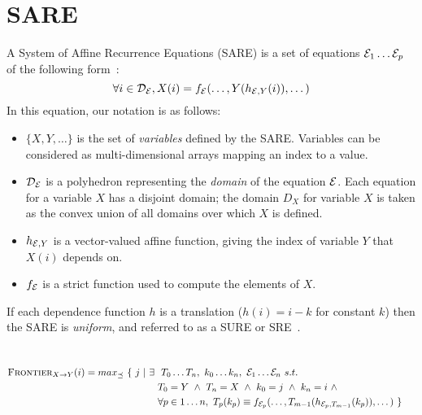 \section{SARE}

A System of Affine Recurrence Equations (SARE) is a set of equations
${\cal E}_1 \dots {\cal E}_p$ of the following form~\cite{DRV00}:
\begin{equation}
\forall i \in {\cal D_{\cal E}}, X(i) = f_{\cal E}(\dots, Y(h_{{\cal
E}, Y}(i)), \dots)
\label{eq:sare}
\end{equation}
In this equation, our notation is as follows:
\begin{itemize}

\item $\{X, Y, \dots\}$ is the set of {\it variables} defined by the
SARE.  Variables can be considered as multi-dimensional arrays mapping
an index to a value.

\item ${\cal D_{\cal E}}$ is a polyhedron representing the {\it
domain} of the equation ${\cal E}$.  Each equation for a variable $X$
has a disjoint domain; the domain $D_X$ for variable $X$ is taken as
the convex union of all domains over which $X$ is defined.

\item $h_{{\cal E}, Y}$ is a vector-valued affine function, giving the
index of variable $Y$ that $X(i)$ depends on.

\item $f_{\cal E}$ is a strict function used to compute the elements
of $X$.

\end{itemize}

If each dependence function $h$ is a translation ($h(i) = i - k$ for
constant $k$) then the SARE is {\it uniform}, and referred to as a
SURE or SRE~\cite{karp67}.


\section{\dep}

\begin{align*}
\textsc{Frontier}_{X \small{\rightarrow} Y}(i) = max_{\preceq}~\{~ j ~|~ \exists ~&~ T_0 \dots T_n, ~ k_0 \dots k_n, ~ {\cal E}_1 \dots {\cal E}_n ~ s.t. ~ & ~ \\ 
~ & T_0 = Y ~\wedge~ T_n = X ~\wedge~ k_0 = j ~\wedge~ k_n = i ~\wedge~ & ~ \\
~ & \forall p \in 1 \dots n, ~ T_p(k_p) \equiv f_{{\cal E}_p}(\dots, T_{m-1}(h_{{{\cal E}_p}, T_{m-1}}(k_p)), \dots) ~ \} & ~ \\
\end{align*}

